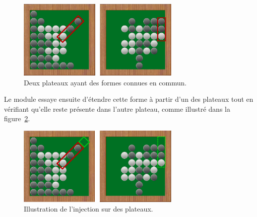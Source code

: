 \begin{figure}[H] 
\begin{center}
\includegraphics[width=0.7\textwidth]{files/raisonneur/cbs_reco1} 
\end{center}
\caption{Deux plateaux ayant des formes connues en commun.} 
\label{img_cbs_reco1}
\end{figure}

Le module essaye ensuite d'étendre cette forme à partir d'un des plateaux tout en vérifiant qu'elle reste présente dans l'autre plateau, comme illustré dans la figure~\ref{img_cbs_reco_forme_injection}.

\begin{figure}[H] 
\begin{center}
\includegraphics[width=0.7\textwidth]{files/raisonneur/cbs_reco3} 
\end{center}
\caption{Illustration de l'injection sur des plateaux.} 
\label{img_cbs_reco_forme_injection}
\end{figure}
